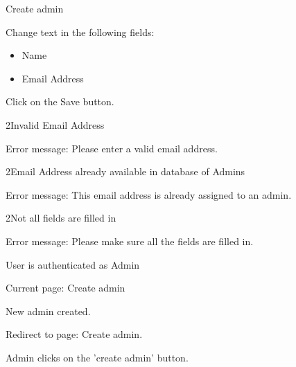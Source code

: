 
\begin{uc}{Create admin}


    \begin{uc-mss}
    \item Change text in the following fields:
        \begin{itemize}
            \item Name
            \item Email Address
            \end{itemize}
    \item Click on the Save button.
    \end{uc-mss}

    \begin{uc-ext}

        \begin{uc-fail}{2}{Invalid Email Address}
        \item Error message: Please enter a valid email address.
        \end{uc-fail}

        \begin{uc-fail}{2}{Email Address already available in database of Admins}
        \item Error message: This email address is already assigned to an admin.
        \end{uc-fail}

        \begin{uc-fail}{2}{Not all fields are filled in}
        \item Error message: Please make sure all the fields are filled in.
        \end{uc-fail}

    \end{uc-ext}

    \begin{uc-pre}
    \item User is authenticated as Admin
    \item Current page: Create admin
    \end{uc-pre}

    \begin{uc-post}
    \item New admin created.
    \item Redirect to page: Create admin.
    \end{uc-post}

    \begin{uc-trig}
        Admin clicks on the 'create admin' button.
    \end{uc-trig}

\end{uc}
